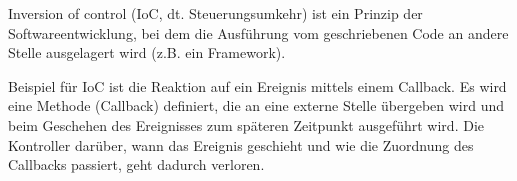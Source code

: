 Inversion of control (IoC, dt. Steuerungsumkehr) ist ein Prinzip der Softwareentwicklung, 
bei dem die Ausführung vom geschriebenen Code an andere Stelle ausgelagert wird
(z.B. ein Framework)\cite{IoCDefinition}.
% 

Beispiel für IoC ist die Reaktion auf ein Ereignis mittels einem Callback. 
Es wird eine Methode (Callback) definiert, die an eine externe Stelle übergeben wird und 
beim Geschehen des Ereignisses zum späteren Zeitpunkt ausgeführt wird. 
Die Kontroller darüber, wann das Ereignis geschieht und wie die Zuordnung des Callbacks passiert, geht dadurch verloren. 